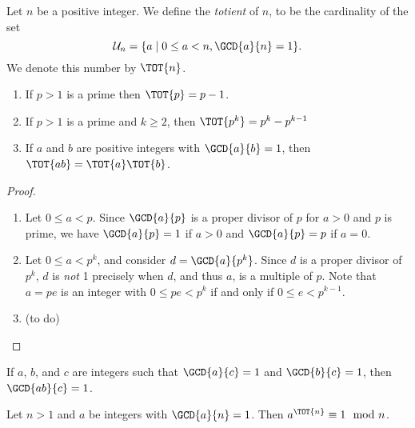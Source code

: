 \documentclass{article}
\begin{document}

\begin{dfn}
Let $n$ be a positive integer. We define the \emph{totient} of $n$, to be the cardinality of the set \[ \mathcal{U}_n = \{ a \mid 0 \leq a < n, \GCD{a}{n} = 1 \}. \] We denote this number by $\TOT{n}$.
\end{dfn}

\begin{thm} \mbox{}
\begin{enumerate}
\item If $p > 1$ is a prime then $\TOT{p} = p-1$.
\item If $p > 1$ is a prime and $k \geq 2$, then $\TOT{p^k} = p^k - p^{k-1}$
\item If $a$ and $b$ are positive integers with $\GCD{a}{b} = 1$, then $\TOT{ab} = \TOT{a}\TOT{b}$.
\end{enumerate}
\end{thm}

\begin{proof} \mbox{}
\begin{enumerate}
\item Let $0 \leq a < p$. Since $\GCD{a}{p}$ is a proper divisor of $p$ for $a > 0$ and $p$ is prime, we have $\GCD{a}{p} = 1$ if $a > 0$ and $\GCD{a}{p} = p$ if $a = 0$.
\item Let $0 \leq a < p^k$, and consider $d = \GCD{a}{p^k}$. Since $d$ is a proper divisor of $p^k$, $d$ is \emph{not} 1 precisely when $d$, and thus $a$, is a multiple of $p$. Note that $a = pe$ is an integer with $0 \leq pe < p^k$ if and only if $0 \leq e < p^{k-1}$.
\item (to do)
\end{enumerate}
\end{proof}

\begin{prop}
If $a$, $b$, and $c$ are integers such that $\GCD{a}{c} = 1$ and $\GCD{b}{c} = 1$, then $\GCD{ab}{c} = 1$.
\end{prop}

\begin{thm}
Let $n > 1$ and $a$ be integers with $\GCD{a}{n} = 1$. Then $a^{\TOT{n}} \equiv 1 \mod n$.
\end{thm}
\end{document}
